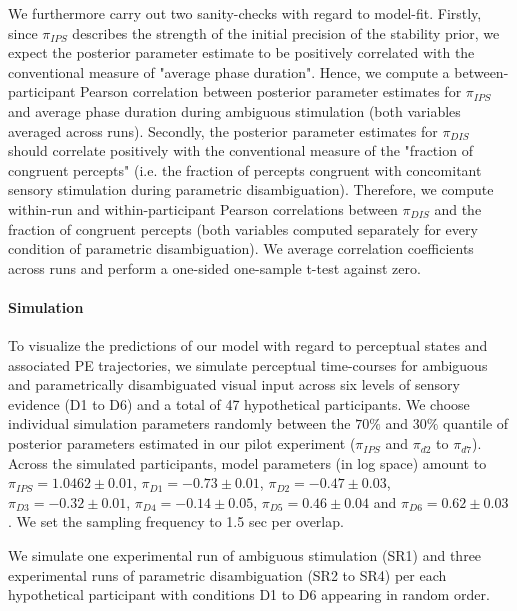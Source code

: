 \documentclass[12pt]{article}
\begin{document}
We furthermore carry out two sanity-checks with regard to model-fit. Firstly, since $\pi_{IPS}$ describes the strength of the initial precision of the stability prior, we expect the posterior parameter estimate to be positively correlated with the conventional measure of "average phase duration". Hence, we compute a between-participant Pearson correlation between posterior parameter estimates for $\pi_{IPS}$ and average phase duration during ambiguous stimulation (both variables averaged across runs). Secondly, the posterior parameter estimates for $\pi_{DIS}$ should correlate positively with the conventional measure of the "fraction of congruent percepts" (i.e. the fraction of percepts congruent with concomitant sensory stimulation during parametric disambiguation). Therefore, we compute within-run and within-participant Pearson correlations between $\pi_{DIS}$ and the fraction of congruent percepts (both variables computed separately for every condition of parametric disambiguation). We average correlation coefficients across runs and perform a one-sided one-sample t-test against zero. 

\paragraph{Simulation}

To visualize the predictions of our model with regard to perceptual states and associated PE trajectories, we simulate perceptual time-courses for ambiguous and parametrically disambiguated visual input across six levels of sensory evidence (D1 to D6) and a total of 47 hypothetical participants. We choose individual simulation parameters randomly between the $70\%$ and $30\%$ quantile of posterior parameters estimated in our pilot experiment ($\pi_{IPS}$ and $\pi_{d2}$ to $\pi_{d7}$). Across the simulated participants, model parameters (in log space) amount to $\pi_{IPS} = 1.0462 \pm 0.01$, $\pi_{D1} = -0.73 \pm 0.01$, $\pi_ {D2} = -0.47 \pm 0.03$, $\pi_ {D3} = -0.32 \pm 0.01$, $\pi_ {D4} = -0.14 \pm 0.05$, $\pi_ {D5} = 0.46 \pm 0.04$ and $\pi_ {D6} = 0.62 \pm 0.03$. We set the sampling frequency to 1.5 sec per overlap. 

We simulate one experimental run of ambiguous stimulation (SR1) and three experimental runs of parametric disambiguation (SR2 to SR4) per each hypothetical participant with conditions D1 to D6 appearing in random order.
\end{document}
